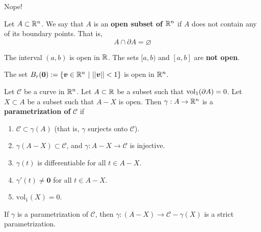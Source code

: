     Nope!


    
    \begin{definition}
        Let $A \subset \mathbb{R}^n$.  We say that $A$ is an\textbf{ open subset of $\mathbb{R}^n$} if $A$ does not contain any of its boundary points.  That is, $$A \cap \partial A = \varnothing$$
    \end{definition}

     \begin{example}
        The interval $(a,b)$ is open in $\mathbb{R}$.  The sets $[a,b)$ and $[a,b]$ are \textbf{not open}.
    \end{example}

    \begin{example}
        The set $B_r(\bm{0}) := \{ \bm{v} \in \mathbb{R}^n \ | \ ||\bm{v}|| < 1\} $ is open in $\mathbb{R}^n$.  
    \end{example}

\begin{definition}[Parametrization]
    Let $\mathcal{C}$ be a curve in $\mathbb{R}^n$.  Let $A \subset \mathbb{R}$ be a subset such that $\textnormal{vol}_1(\partial A) = 0$.  Let $X \subset A$ be a subset such that $A - X$ is open.  Then  $\gamma : A \to \mathbb{R}^n$ is a \textbf{parametrization of} $\mathcal{C}$ if 
    
    \begin{enumerate}
        
        \item $\mathcal{C} \subset \gamma(A)$ (that is, $\gamma$ surjects onto $\mathcal{C}$).
        \item $\gamma(A - X) \subset \mathcal{C}$, and $\gamma : A - X \to \mathcal{C}$ is injective. 
        \item $\gamma(t)$ is differentiable for all $t \in A - X$.
        \item $\gamma'(t) \neq \bm{0}$ for all $t \in A - X$. 
        \item $\text{vol}_1(X) = 0$.
    \end{enumerate}
    
    \end{definition}

\begin{remark}
If $\gamma$ is a parametrization of $\mathcal{C}$, then $\gamma: (A-X) \to \mathcal{C} - \gamma(X)$ is a strict parametrization.
\end{remark}
    
